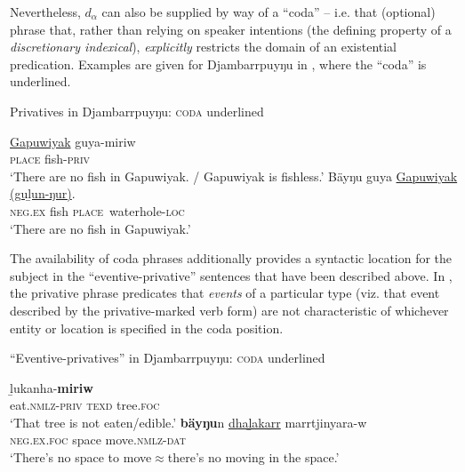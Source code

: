 \documentclass[output=paper,draft,draftmode,colorlinks,citecolor=brown]{langscibook}
\begin{document}
Nevertheless, $d_\alpha$ can also be supplied by way of a ``coda'' -- i.e.
that (optional) phrase that, rather than relying on speaker intentions (the
defining property of a \textit{discretionary indexical}),
\textit{explicitly} restricts the domain of an existential predication.
Examples are given for Djambarrpuyŋu in , where the ``coda'' is underlined.

\begin{exe}\ex Privatives in Djambarrpuyŋu: \textsc{coda} underlined
    \begin{xlist}
\ex\gll \uline{Gapuwiyak} guya-miriw\\
\textsc{place} fish-\textsc{priv}\\
\glt `There are no fish in Gapuwiyak. / Gapuwiyak is fishless.'
\ex\gll Bäyŋu guya \uline{Gapuwiyak (guḻun-ŋur)}.\\
 \textsc{neg.ex} fish \textsc{place}~waterhole-\textsc{loc}\\
    \glt `There are no fish in Gapuwiyak.'\end{xlist}\end{exe}
%
The availability of coda phrases additionally provides a syntactic location
    for the subject in the ``eventive-privative'' sentences that have been
    described above. In , the privative phrase
    predicates that \textit{events} of a particular type (viz. that event
    described by the privative-marked verb form) are not characteristic of
    whichever entity  or location
     is specified in the coda position.
%
\begin{exe}\ex\label{ex:austr-djamb-coda} 
    ``Eventive-privatives'' in Djambarrpuyŋu: \textsc{coda} underlined
    \begin{xlist}
    \ex\label{ex:austr-djamb-coda-edible} 
    \gll ḻukanha-\textbf{miriw}  \\
eat.\textsc{nmlz}-\textsc{priv} \textsc{texd} tree.\textsc{foc}\\
\glt `That tree is not eaten\slash edible.'
    \ex\label{ex:austr-djamb-coda-space}
    \gll \textbf{bäyŋu}n \uline{dhaḻakarr} marrtjinyara-w\\
\textsc{neg.ex}.\textsc{foc} space move.\textsc{nmlz}-\textsc{dat}\\
\glt   `There's no space to move$\approx$there's no moving in the space.'
    \end{xlist}\end{exe}
\end{document}

